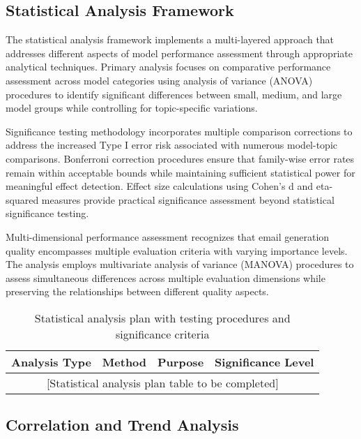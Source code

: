 \subsection{Statistical Analysis Framework}

The statistical analysis framework implements a multi-layered approach that addresses different aspects of model performance assessment through appropriate analytical techniques. Primary analysis focuses on comparative performance assessment across model categories using analysis of variance (ANOVA) procedures to identify significant differences between small, medium, and large model groups while controlling for topic-specific variations.

Significance testing methodology incorporates multiple comparison corrections to address the increased Type I error risk associated with numerous model-topic comparisons. Bonferroni correction procedures ensure that family-wise error rates remain within acceptable bounds while maintaining sufficient statistical power for meaningful effect detection. Effect size calculations using Cohen's d and eta-squared measures provide practical significance assessment beyond statistical significance testing.

Multi-dimensional performance assessment recognizes that email generation quality encompasses multiple evaluation criteria with varying importance levels. The analysis employs multivariate analysis of variance (MANOVA) procedures to assess simultaneous differences across multiple evaluation dimensions while preserving the relationships between different quality aspects.

\begin{table}[htbp]
    \centering
    \caption{Statistical analysis plan with testing procedures and significance criteria}
    \label{tab:statistical-analysis-plan}
    \begin{tabular}{|l|l|l|c|}
    \hline
    \textbf{Analysis Type} & \textbf{Method} & \textbf{Purpose} & \textbf{Significance Level} \\
    \hline
    \multicolumn{4}{|c|}{[Statistical analysis plan table to be completed]} \\
    \hline
    \end{tabular}
\end{table}

\subsection{Correlation and Trend Analysis}

